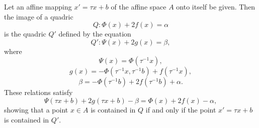 Let an affine mapping $x' = \tau x + b$ of the affine space $A$ onto itself be given. Then the image of a quadric
$$Q: \Phi(x) + 2f(x) = \alpha$$
is the quadric $Q'$ defined by the equation
$$Q': \Psi(x) + 2g(x) = \beta,$$
where
$$\Psi(x) = \Phi(\tau^{-1}x),$$
$$g(x) = -\Phi(\tau^{-1}x, \tau^{-1}b) + f(\tau^{-1}x),$$
$$\beta = -\Phi(\tau^{-1}b) + 2f(\tau^{-1}b) + \alpha.$$
These relations satisfy
$$\Psi(\tau x + b) + 2g(\tau x + b) - \beta = \Phi(x) + 2f(x) - \alpha,$$
showing that a point $x \in A$ is contained in $Q$ if and only if the point $x' = \tau x + b$ is contained in $Q'$.
